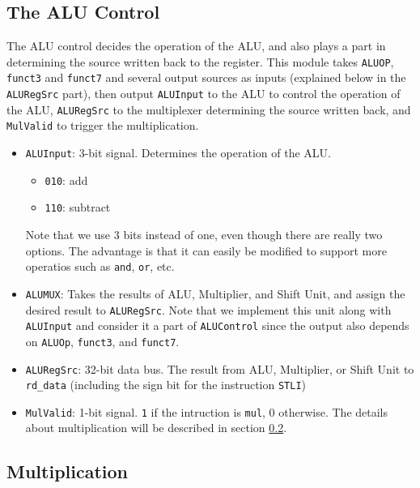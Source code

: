 \documentclass[12pt]{article}
\begin{document}
\subsection{The ALU Control}%
\label{sub:the_alu_control}

The ALU control decides the operation of the ALU, and also plays a part in
determining the source written back to the register. This module takes 
\texttt{ALUOP}, \texttt{funct3} and \texttt{funct7} and several output sources
as inputs (explained below in the \texttt{ALURegSrc} part), then output
\texttt{ALUInput} to the ALU to control the operation of the ALU,  
\texttt{ALURegSrc} to the multiplexer determining the source written back, and
\texttt{MulValid} to trigger the multiplication.

\begin{itemize}
	\item \texttt{ALUInput}: 3-bit signal. Determines the operation of the ALU.
		\begin{itemize}
			\item \texttt{010}: add
			\item \texttt{110}: subtract
		\end{itemize}
		Note that we use 3 bits instead of one, even though there are really
		two options. The advantage is that it can easily be modified to support 
		more operatios such as \texttt{and}, \texttt{or}, etc.


    \item \texttt{ALUMUX}: Takes the results of ALU, Multiplier, and Shift Unit, and assign
        the desired result to \texttt{ALURegSrc}. Note that we implement this unit
        along with \texttt{ALUInput} and consider it a part of \texttt{ALUControl} 
        since the output also depends on \texttt{ALUOp}, \texttt{funct3}, and \texttt{funct7}. 
        
    \item \texttt{ALURegSrc}: 32-bit data bus. The result from ALU, Multiplier, or Shift Unit to
        \texttt{rd\_data} (including the sign bit for the instruction \texttt{STLI})

	\item \texttt{MulValid}: 1-bit signal. \texttt{1} if the intruction is
		\texttt{mul}, 0 otherwise. The details about multiplication will be described
		in section \ref{sub:multiplication}.
\end{itemize}

\subsection{Multiplication}%
\label{sub:multiplication}
\end{document}
